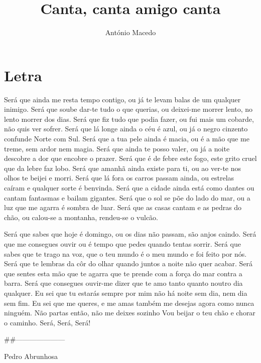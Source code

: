 \documentclass{article}
\author{António Macedo}
\title{Canta, canta amigo canta}
\begin{document}
\maketitle
\section{Letra}
Será que ainda me resta tempo
contigo,
ou já te levam balas de um qualquer
inimigo.
Será que soube dar-te tudo o que
querias,
ou deixei-me morrer lento, no lento
morrer dos dias.
Será que fiz tudo que podia fazer,
ou fui mais um cobarde, não quis ver
sofrer.
Será que lá longe ainda o céu é azul,
ou já o negro cinzento confunde Norte
com Sul.
Será que a tua pele ainda é macia,
ou é a mão que me treme, sem ardor
nem magia.
Será que ainda te posso valer,
ou já a noite descobre a dor que
encobre o prazer.
Será que é de febre este fogo,
este grito cruel que da lebre faz lobo.
Será que amanhã ainda existe para ti,
ou ao ver-te nos olhos te beijei e
morri.
Será que lá fora os carros passam
ainda,
ou estrelas caíram e qualquer sorte é
benvinda.
Será que a cidade ainda está como
dantes
ou cantam fantasmas e bailam
gigantes.
Será que o sol se põe do lado do mar,
ou a luz que me agarra é sombra de
luar.
Será que as casas cantam e as pedras
do chão,
ou calou-se a montanha, rendeu-se o
vulcão.

Será que sabes que hoje é domingo,
ou os dias não passam, são anjos
caindo.
Será que me consegues ouvir
ou é tempo que pedes quando tentas
sorrir.
Será que sabes que te trago na voz,
que o teu mundo é o meu mundo e foi
feito por nós.
Será que te lembras da côr do olhar
quando juntos a noite não quer acabar.
Será que sentes esta mão que te agarra
que te prende com a força do mar
contra a barra.
Será que consegues ouvir-me dizer
que te amo tanto quanto noutro dia
qualquer.
Eu sei que tu estarás sempre por mim
não há noite sem dia, nem dia sem fim.
Eu sei que me queres, e me amas
também
me desejas agora como nunca
ninguém.
Não partas então, não me deixes
sozinho
Vou beijar o teu chão e chorar o
caminho.
Será,
Será,
Será!

##---------------------
\begin{flushleft}
Pedro Abrunhosa 
\end{flushleft}
\end{document}
